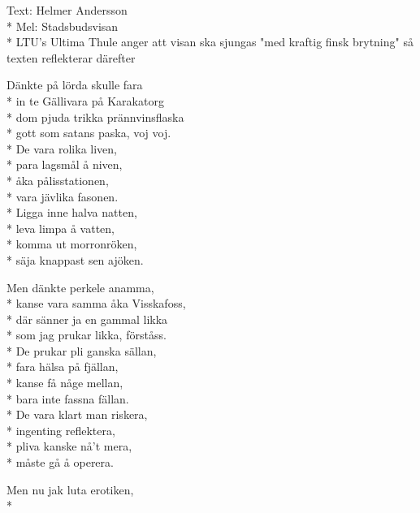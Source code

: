 \begin{SongText}[Gällivarevisan]
    \begin{SongInfo}
        Text: Helmer Andersson\\*%
        Mel:  Stadsbudsvisan\\*%
        LTU's Ultima Thule anger att visan ska sjungas "med kraftig finsk brytning" så texten reflekterar därefter
    \end{SongInfo}
    \begin{SongVerse}
        Dänkte på lörda skulle fara\\*%
        in te Gällivara på Karakatorg\\*%
        dom pjuda trikka prännvinsflaska\\*%
        gott som satans paska, voj voj.\\*%
        De vara rolika liven,\\*%
        para lagsmål å niven,\\*%
        åka pålisstationen,\\*%
        vara jävlika fasonen.\\*%
        Ligga inne halva natten,\\*%
        leva limpa å vatten,\\*%
        komma ut morronröken,\\*%
        säja knappast sen ajöken.
    \end{SongVerse}
    \begin{SongVerse}
        Men dänkte perkele anamma,\\*%
        kanse vara samma åka Visskafoss,\\*%
        där sänner ja en gammal likka\\*%
        som jag prukar likka, förståss.\\*%
        De prukar pli ganska sällan,\\*%
        fara hälsa på fjällan,\\*%
        kanse få någe mellan,\\*%
        bara inte fassna fällan.\\*%
        De vara klart man riskera,\\*%
        ingenting reflektera,\\*%
        pliva kanske nå’t mera,\\*%
        måste gå å operera.
    \end{SongVerse}
    \begin{SongVerse}
        Men nu jak luta erotiken,\\*%

\end{SongVerse}
\end{SongText}
